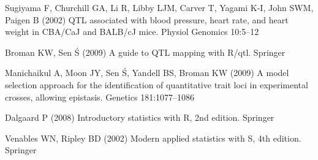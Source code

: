 \documentclass[10pt,letterpaper]{article}
\newenvironment{hanging}
{\begin{list}{}
        {\setlength{\labelwidth}{0in}
         \setlength{\leftmargin}{1em}
         \setlength{\itemindent}{-1em}
        }
}
{\end{list}}
\begin{document}
\begin{hanging}

\item Sugiyama F, Churchill GA, Li R, Libby LJM, Carver T, Yagami K-I,
  John SWM, Paigen B (2002) QTL associated with blood pressure, heart
  rate, and heart weight in CBA/CaJ and BALB/cJ mice.  Physiol
  Genomics 10:5--12

\item Broman KW, Sen \'S (2009) A guide to QTL mapping with
    R/qtl.  Springer

\item 	Manichaikul A, Moon JY, Sen \'S, Yandell BS, Broman KW (2009)
  A model selection approach for the identification of quantitative
  trait loci in experimental crosses, allowing epistasis. Genetics
  181:1077--1086 

\item Dalgaard P (2008) Introductory statistics with R, 2nd edition.
  Springer

\item Venables WN, Ripley BD (2002) Modern applied statistics with S,
  4th edition. Springer


\end{hanging}
\end{document}
